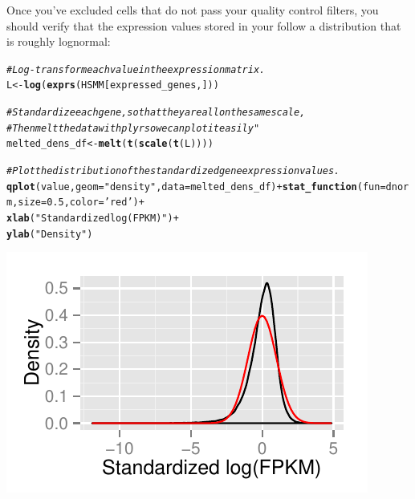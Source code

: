 \documentclass[10pt,oneside]{article}\usepackage[]{graphicx}\usepackage[]{color}
\makeatletter
\def\maxwidth{ %
  \ifdim\Gin@nat@width>\linewidth
    \linewidth
  \else
    \Gin@nat@width
  \fi
}
\newcommand{\hlnum}[1]{\textcolor[rgb]{0.686,0.059,0.569}{#1}}%
\newcommand{\hlstr}[1]{\textcolor[rgb]{0.192,0.494,0.8}{#1}}%
\newcommand{\hlcom}[1]{\textcolor[rgb]{0.678,0.584,0.686}{\textit{#1}}}%
\newcommand{\hlopt}[1]{\textcolor[rgb]{0,0,0}{#1}}%
\newcommand{\hlstd}[1]{\textcolor[rgb]{0.345,0.345,0.345}{#1}}%
\newcommand{\hlkwb}[1]{\textcolor[rgb]{0.69,0.353,0.396}{#1}}%
\newcommand{\hlkwc}[1]{\textcolor[rgb]{0.333,0.667,0.333}{#1}}%
\newcommand{\hlkwd}[1]{\textcolor[rgb]{0.737,0.353,0.396}{\textbf{#1}}}%
\newenvironment{kframe}{%
 \def\at@end@of@kframe{}%
 \ifinner\ifhmode%
  \def\at@end@of@kframe{\end{minipage}}%
  \begin{minipage}{\columnwidth}%
 \fi\fi%
 \def\FrameCommand##1{\hskip\@totalleftmargin \hskip-\fboxsep
 \colorbox{shadecolor}{##1}\hskip-\fboxsep
     \hskip-\linewidth \hskip-\@totalleftmargin \hskip\columnwidth}%
 \MakeFramed {\advance\hsize-\width
   \@totalleftmargin\z@ \linewidth\hsize
   \@setminipage}}%
 {\par\unskip\endMakeFramed%
 \at@end@of@kframe}
\newenvironment{knitrout}{}{} %
\makeatother
\begin{document}
Once you've excluded cells that do not pass your quality control filters, you should verify that the expression values stored in your  follow a distribution that is roughly lognormal:  
\begin{knitrout}
\color{fgcolor}\begin{kframe}
\begin{alltt}
\hlcom{# Log-transform each value in the expression matrix.}
\hlstd{L} \hlkwb{<-} \hlkwd{log}\hlstd{(}\hlkwd{exprs}\hlstd{(HSMM[expressed_genes,]))}

\hlcom{# Standardize each gene, so that they are all on the same scale,}
\hlcom{# Then melt the data with plyr so we can plot it easily"}
\hlstd{melted_dens_df} \hlkwb{<-} \hlkwd{melt}\hlstd{(}\hlkwd{t}\hlstd{(}\hlkwd{scale}\hlstd{(}\hlkwd{t}\hlstd{(L))))}

\hlcom{# Plot the distribution of the standardized gene expression values.}
\hlkwd{qplot}\hlstd{(value,} \hlkwc{geom}\hlstd{=}\hlstr{"density"}\hlstd{,} \hlkwc{data}\hlstd{=melted_dens_df)} \hlopt{+}  \hlkwd{stat_function}\hlstd{(}\hlkwc{fun} \hlstd{= dnorm,} \hlkwc{size}\hlstd{=}\hlnum{0.5}\hlstd{,} \hlkwc{color}\hlstd{=}\hlstr{'red'}\hlstd{)} \hlopt{+}
\hlkwd{xlab}\hlstd{(}\hlstr{"Standardized log(FPKM)"}\hlstd{)} \hlopt{+}
\hlkwd{ylab}\hlstd{(}\hlstr{"Density"}\hlstd{)}
\end{alltt}


{\ttfamily\noindent\color{warningcolor}{\#\# Warning: Removed 1804710 rows containing non-finite values (stat\_density).}}\end{kframe}

{\centering \includegraphics[width=\maxwidth]{figure/lognormal_plot-1} 

}



\end{knitrout}
\end{document}
